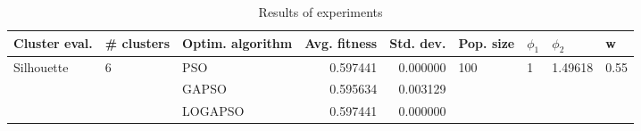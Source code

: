 \begin{table}
\centering
\caption{Results of experiments}
\begin{tabular}{lllrrllll}
\toprule
              Cluster eval. &        \# clusters & Optim. algorithm &  Avg. fitness &  Std. dev. &            Pop. size &         $\phi_{1}$ &               $\phi_{2}$ &                     w \\
\midrule
\multirow{3}{*}{Silhouette} & \multirow{3}{*}{6} &              PSO &      0.597441 &   0.000000 & \multirow{3}{*}{100} & \multirow{3}{*}{1} & \multirow{3}{*}{1.49618} & \multirow{3}{*}{0.55} \\
                            &                    &            GAPSO &      0.595634 &   0.003129 &                      &                    &                          &                       \\
                            &                    &          LOGAPSO &      0.597441 &   0.000000 &                      &                    &                          &                       \\
\bottomrule
\end{tabular}
\end{table}

